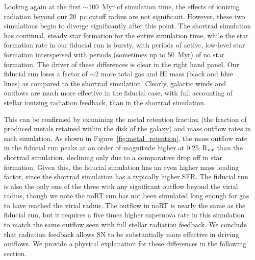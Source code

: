 \documentclass[twocolumn]{aastex62}
\begin{document}
Looking again at the first $\sim$100~Myr of simulation time, the effects of ionizing radiation beyond our 20~pc cutoff radius are not significant. However, these two simulations begin to diverge significantly after this point. The shortrad simulation has continual, steady star formation for the entire simulation time, while the star formation rate in our fiducial run is bursty, with periods of active, low-level star formation interspersed with periods (sometimes up to 50~Myr) of no star formation. The driver of these differences is clear in the right hand panel. Our fiducial run 
    loses a factor of $\sim 2$ more 
total gas and HI mass (black and blue lines) as compared to the shortrad simulation. 
Clearly, galactic winds and outflows are much more effective in the fiducial case, with full accounting of stellar ionizing radiation feedback, than in the shortrad simulation.

This can be confirmed by examining the metal retention fraction (the fraction of produced metals retained within the disk of the galaxy) and mass outflow rates in each simulation. As shown in Figure~\ref{fig:metal_retention}, the mass outflow rate in the fiducial run peaks at an order of magnitude higher at 0.25~R$_{\rm vir}$ than the shortrad simulation, declining only due to a comparative drop off in star formation. Given this, the fiducial simulation has an even higher mass loading factor, since the shortrad simulation has a typically higher SFR. The fiducial run is also the only 
   one of the three 
with any significant outflow beyond the virial radius, though we note the noRT run has not been simulated long enough for gas to have reached the virial radius. The outflow in noRT is nearly the same as the fiducial run, but it requires a five times higher supernova rate in this simulation to match the same outflow seen with full stellar radiation feedback. We conclude that radiation feedback allows SN to be substantially more effective in driving outflows. We provide a physical
   explanation
for these differences in the following section.
\end{document}
